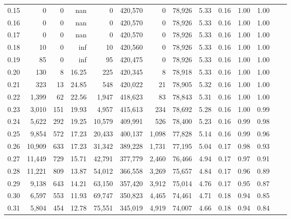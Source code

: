 \begin{tabular}{rrrrrrrrrrrrrr}
0.15 &       0 &      0 &     nan &        0 &  420,570 &       0 &  78,926 &  5.33 &  0.16 &  1.00 &      1.00 \\
0.16 &       0 &      0 &     nan &        0 &  420,570 &       0 &  78,926 &  5.33 &  0.16 &  1.00 &      1.00 \\
0.17 &       0 &      0 &     nan &        0 &  420,570 &       0 &  78,926 &  5.33 &  0.16 &  1.00 &      1.00 \\
0.18 &      10 &      0 &     inf &       10 &  420,560 &       0 &  78,926 &  5.33 &  0.16 &  1.00 &      1.00 \\
0.19 &      85 &      0 &     inf &       95 &  420,475 &       0 &  78,926 &  5.33 &  0.16 &  1.00 &      1.00 \\
0.20 &     130 &      8 &   16.25 &      225 &  420,345 &       8 &  78,918 &  5.33 &  0.16 &  1.00 &      1.00 \\
0.21 &     323 &     13 &   24.85 &      548 &  420,022 &      21 &  78,905 &  5.32 &  0.16 &  1.00 &      1.00 \\
0.22 &   1,399 &     62 &   22.56 &    1,947 &  418,623 &      83 &  78,843 &  5.31 &  0.16 &  1.00 &      1.00 \\
0.23 &   3,010 &    151 &   19.93 &    4,957 &  415,613 &     234 &  78,692 &  5.28 &  0.16 &  1.00 &      0.99 \\
0.24 &   5,622 &    292 &   19.25 &   10,579 &  409,991 &     526 &  78,400 &  5.23 &  0.16 &  0.99 &      0.98 \\
0.25 &   9,854 &    572 &   17.23 &   20,433 &  400,137 &   1,098 &  77,828 &  5.14 &  0.16 &  0.99 &      0.96 \\
0.26 &  10,909 &    633 &   17.23 &   31,342 &  389,228 &   1,731 &  77,195 &  5.04 &  0.17 &  0.98 &      0.93 \\
0.27 &  11,449 &    729 &   15.71 &   42,791 &  377,779 &   2,460 &  76,466 &  4.94 &  0.17 &  0.97 &      0.91 \\
0.28 &  11,221 &    809 &   13.87 &   54,012 &  366,558 &   3,269 &  75,657 &  4.84 &  0.17 &  0.96 &      0.89 \\
0.29 &   9,138 &    643 &   14.21 &   63,150 &  357,420 &   3,912 &  75,014 &  4.76 &  0.17 &  0.95 &      0.87 \\
0.30 &   6,597 &    553 &   11.93 &   69,747 &  350,823 &   4,465 &  74,461 &  4.71 &  0.18 &  0.94 &      0.85 \\
0.31 &   5,804 &    454 &   12.78 &   75,551 &  345,019 &   4,919 &  74,007 &  4.66 &  0.18 &  0.94 &      0.84 \\

\end{tabular}
